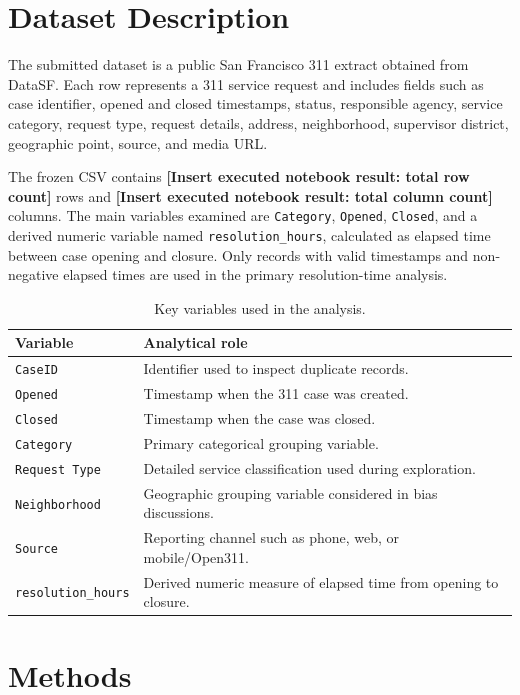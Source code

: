\documentclass[12pt]{article}
\newcommand{\resultplaceholder}[1]{\textbf{[Insert executed notebook result: #1]}}
\begin{document}
\section*{Dataset Description}
The submitted dataset is a public San Francisco 311 extract obtained from DataSF. Each row represents a 311 service request and includes fields such as case identifier, opened and closed timestamps, status, responsible agency, service category, request type, request details, address, neighborhood, supervisor district, geographic point, source, and media URL.

The frozen CSV contains \resultplaceholder{total row count} rows and \resultplaceholder{total column count} columns. The main variables examined are \texttt{Category}, \texttt{Opened}, \texttt{Closed}, and a derived numeric variable named \texttt{resolution\_hours}, calculated as elapsed time between case opening and closure. Only records with valid timestamps and non-negative elapsed times are used in the primary resolution-time analysis.

\begin{table}[ht]
\centering\small
\caption{Key variables used in the analysis.}
\begin{tabular}{p{}p{}}
\toprule
\textbf{Variable} & \textbf{Analytical role} \\
\midrule
\texttt{CaseID} & Identifier used to inspect duplicate records. \\
\texttt{Opened} & Timestamp when the 311 case was created. \\
\texttt{Closed} & Timestamp when the case was closed. \\
\texttt{Category} & Primary categorical grouping variable. \\
\texttt{Request Type} & Detailed service classification used during exploration. \\
\texttt{Neighborhood} & Geographic grouping variable considered in bias discussions. \\
\texttt{Source} & Reporting channel such as phone, web, or mobile/Open311. \\
\texttt{resolution\_hours} & Derived numeric measure of elapsed time from opening to closure. \\
\bottomrule
\end{tabular}
\end{table}

\section*{Methods}
\end{document}
